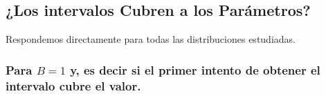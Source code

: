 \documentclass[]{article}
\newenvironment{Shaded}{\begin{snugshade}}{\end{snugshade}}
\newcommand{\DataTypeTok}[1]{\textcolor[rgb]{0.13,0.29,0.53}{#1}}
\newcommand{\DecValTok}[1]{\textcolor[rgb]{0.00,0.00,0.81}{#1}}
\newcommand{\KeywordTok}[1]{\textcolor[rgb]{0.13,0.29,0.53}{\textbf{#1}}}
\newcommand{\NormalTok}[1]{#1}
\newcommand{\OperatorTok}[1]{\textcolor[rgb]{0.81,0.36,0.00}{\textbf{#1}}}
\newcommand{\StringTok}[1]{\textcolor[rgb]{0.31,0.60,0.02}{#1}}
\begin{document}
\begin{Shaded}
\end{Shaded}

\hypertarget{los-intervalos-cubren-a-los-parametros}{%
\subsection{¿Los intervalos Cubren a los
Parámetros?}\label{los-intervalos-cubren-a-los-parametros}}

Respondemos directamente para todas las distribuciones estudiadas.

\hypertarget{para-b1-y-es-decir-si-el-primer-intento-de-obtener-el-intervalo-cubre-el-valor.}{%
\subsubsection{\texorpdfstring{Para \(B=1\) y, es decir si el primer
intento de obtener el intervalo cubre el
valor.}{Para B=1 y, es decir si el primer intento de obtener el intervalo cubre el valor.}}\label{para-b1-y-es-decir-si-el-primer-intento-de-obtener-el-intervalo-cubre-el-valor.}}
\end{document}
